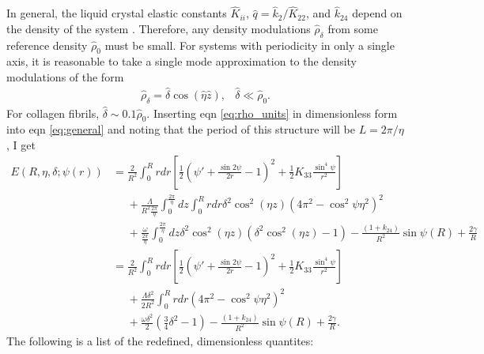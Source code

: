 \documentclass[12pt]{article}
\begin{document}
In general, the liquid crystal elastic constants $\hat{K}_{ii}$, $\hat{q}=\hat{k}_{2}/\hat{K}_{22}$, and $\hat{k}_{24}$ depend on the density of the system \cite{Odijk:liqcryst1986}. Therefore, any density modulations $\hat{\rho}_{\delta}$ from some reference density $\hat{\rho}_0$ must be small. For systems with periodicity in only a single axis, it is reasonable to take a single mode approximation to the density modulations of the form
\begin{equation}\label{eq:rho_units}
\begin{array}{lr}
	\hat{\rho}_{\delta}=\hat{\delta}\cos(\hat{\eta}\hat{z}), &\hat{\delta}\ll\hat{\rho}_0.
\end{array}
\end{equation}
For collagen fibrils, $\hat{\delta}\sim0.1\hat{\rho}_0$. Inserting eqn \ref{eq:rho_units} in dimensionless form into eqn \ref{eq:general} and noting that the period of this structure will be $L=2\pi/\eta$, I get
\begin{align}\label{eq:final}
E(R,\eta,\delta;\psi(r))&=\frac{2}{R^2}\int_0^{R}rdr\left[\frac{1}{2}\left(\psi'+\frac{\sin2\psi}{2r}-1\right)^2+\frac{1}{2}K_{33}\frac{\sin^4\psi}{r^2}\right]\nonumber\\
&\phantom{=}+\frac{\Lambda}{R^2{\frac{2\pi}{\eta}}}\int_0^{{\frac{2\pi}{\eta}}}dz\int_0^{R}rdr\delta^2\cos^2(\eta z)\left(4\pi^2-\cos^2\psi\eta^2\right)^2\nonumber\\
&\phantom{=}+\frac{\omega}{{\frac{2\pi}{\eta}}}\int_0^{{\frac{2\pi}{\eta}}}dz\delta^2\cos^2(\eta z)\left(\delta^2\cos^2(\eta z)-1\right)-\frac{(1+k_{24})}{R^2}\sin\psi(R)+\frac{2\gamma}{R}\nonumber\\
&=\frac{2}{R^2}\int_0^{R}rdr\left[\frac{1}{2}\left(\psi'+\frac{\sin2\psi}{2r}-1\right)^2+\frac{1}{2}K_{33}\frac{\sin^4\psi}{r^2}\right]\nonumber\\
&\phantom{=}+\frac{\Lambda\delta^2}{2R^2}\int_0^{R}rdr\left(4\pi^2-\cos^2\psi\eta^2\right)^2\nonumber\\
&\phantom{=}+\frac{\omega\delta^2}{2}\left(\frac{3}{4}\delta^2-1\right)-\frac{(1+k_{24})}{R^2}\sin\psi(R)+\frac{2\gamma}{R}.
\end{align}
The following is a list of the redefined, dimensionless quantites:
\end{document}
